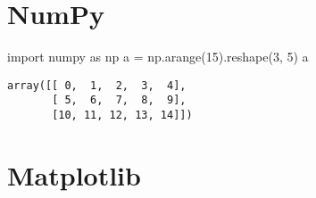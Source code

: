 \documentclass[
  letterpaper,
  DIV=11,
  numbers=noendperiod]{scrreprt}
\newenvironment{Shaded}{\begin{snugshade}}{\end{snugshade}}
\newcommand{\DecValTok}[1]{\textcolor[rgb]{0.68,0.00,0.00}{#1}}
\newcommand{\ImportTok}[1]{\textcolor[rgb]{0.00,0.46,0.62}{#1}}
\newcommand{\NormalTok}[1]{\textcolor[rgb]{0.00,0.46,0.62}{#1}}
\newcommand{\OperatorTok}[1]{\textcolor[rgb]{0.37,0.37,0.37}{#1}}
\begin{document}
\hypertarget{numpy}{%
\section{NumPy}\label{numpy}}

\begin{Shaded}
\begin{Highlighting}[]
\ImportTok{import}\NormalTok{ numpy }\ImportTok{as}\NormalTok{ np}
\NormalTok{a }\OperatorTok{=}\NormalTok{ np.arange(}\DecValTok{15}\NormalTok{).reshape(}\DecValTok{3}\NormalTok{, }\DecValTok{5}\NormalTok{)}
\NormalTok{a}
\end{Highlighting}
\end{Shaded}

\begin{verbatim}
array([[ 0,  1,  2,  3,  4],
       [ 5,  6,  7,  8,  9],
       [10, 11, 12, 13, 14]])
\end{verbatim}

\hypertarget{matplotlib}{%
\section{Matplotlib}\label{matplotlib}}
\end{document}
